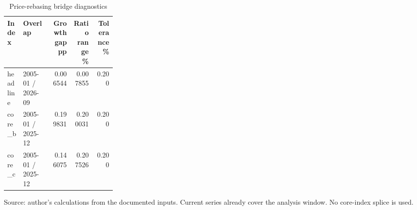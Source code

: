 \begin{table}[htbp]
\centering
\footnotesize
\caption{Price-rebasing bridge diagnostics}
\begin{tabularx}{\linewidth}{Xp{0.26\linewidth}rrr}
\toprule
Index & Overlap & Growth gap pp & Ratio range \% & Tolerance \% \\
\midrule
headline & 2005-01 / 2026-09 & 0.006544 & 0.007855 & 0.200 \\
core\_\allowbreak{}b & 2005-01 / 2025-12 & 0.199831 & 0.200031 & 0.200 \\
core\_\allowbreak{}c & 2005-01 / 2025-12 & 0.146075 & 0.207526 & 0.200 \\
\bottomrule
\end{tabularx}
\par\vspace{3pt}\begin{minipage}{\linewidth}\footnotesize Source: author's calculations from the documented inputs.\allowbreak{} Current series already cover the analysis window.\allowbreak{} No core-index splice is used.\allowbreak{}\end{minipage}
\end{table}
